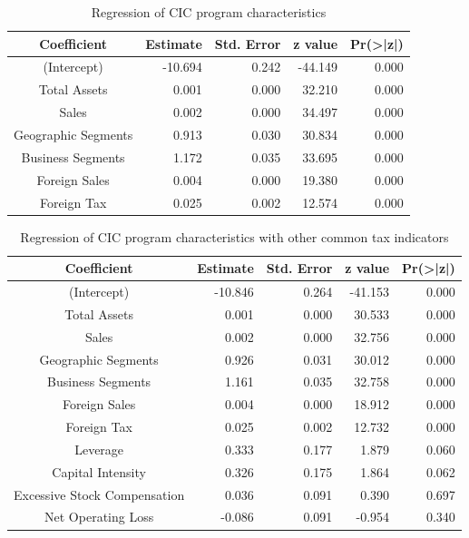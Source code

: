 \documentclass[12pt]{article}
\begin{document}
\begin{table}[ht]
\centering
\caption{Regression of CIC program characteristics}
\label{tab:Regression}
\begin{tabular}{crrrr}
  \hline
Coefficient & Estimate & Std. Error & z value & Pr(>|z|) \\ 
  \hline
  (Intercept) & -10.694 & 0.242 & -44.149 & 0.000 \\ 
  Total Assets & 0.001 & 0.000 & 32.210 & 0.000 \\ 
  Sales & 0.002 & 0.000 & 34.497 & 0.000 \\ 
  Geographic Segments & 0.913 & 0.030 & 30.834 & 0.000 \\ 
  Business Segments & 1.172 & 0.035 & 33.695 & 0.000 \\ 
  Foreign Sales & 0.004 & 0.000 & 19.380 & 0.000 \\ 
  Foreign Tax & 0.025 & 0.002 & 12.574 & 0.000 \\ 
   \hline
\end{tabular}
\end{table}




\begin{table}[ht]
\centering
\caption{Regression of CIC program characteristics with other common tax indicators}
\label{tab:Regression2}
\begin{tabular}{crrrr}
  \hline
Coefficient & Estimate & Std. Error & z value & Pr(>|z|) \\ 
  \hline
(Intercept) & -10.846 & 0.264 & -41.153 & 0.000 \\ 
  Total Assets & 0.001 & 0.000 & 30.533 & 0.000 \\ 
  Sales & 0.002 & 0.000 & 32.756 & 0.000 \\ 
  Geographic Segments & 0.926 & 0.031 & 30.012 & 0.000 \\ 
  Business Segments & 1.161 & 0.035 & 32.758 & 0.000 \\ 
  Foreign Sales & 0.004 & 0.000 & 18.912 & 0.000 \\ 
  Foreign Tax & 0.025 & 0.002 & 12.732 & 0.000 \\  
  Leverage & 0.333 & 0.177 & 1.879 & 0.060 \\ 
  Capital Intensity & 0.326 & 0.175 & 1.864 & 0.062 \\ 
  Excessive Stock Compensation & 0.036 & 0.091 & 0.390 & 0.697 \\ 
  Net Operating Loss & -0.086 & 0.091 & -0.954 & 0.340 \\ 
   \hline
\end{tabular}
\end{table}
\end{document}
